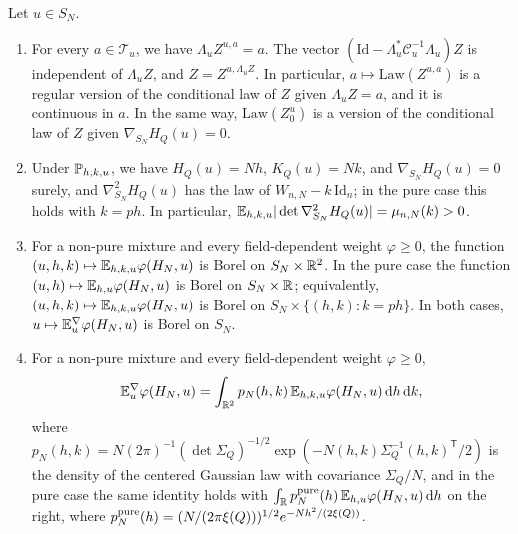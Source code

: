 \begin{lemma}\label{lem:kr-conditioned}
Let $u\in S_N$.
\begin{enumerate}
\item For every $a\in \mathcal T_u$, we have $\Lambda_uZ^{u,a}=a$. The vector $(\mathrm{Id}-\Lambda_u^{*}\mathcal C_u^{-1}\Lambda_u)Z$ is independent of $\Lambda_uZ$, and $Z=Z^{u,\Lambda_uZ}$. In particular, $a\mapsto\mathrm{Law}(Z^{u,a})$ is a regular version of the conditional law of $Z$ given $\Lambda_uZ=a$, and it is continuous in $a$. In the same way, $\mathrm{Law}(Z^u_0)$ is a version of the conditional law of $Z$ given $\nabla_{S_N}H_Q(u)=0$.
\item Under $\mathbb P_{h,k,u}$, we have $H_Q(u)=Nh$, $K_Q(u)=Nk$, and $\nabla_{S_N}H_Q(u)=0$ surely, and $\nabla^2_{S_N}H_Q(u)$ has the law of $W_{n,N}-k\,\mathrm{Id}_n$; in the pure case this holds with $k=ph$. In particular, $\mathbb E_{h,k,u}|\det\nabla^2_{S_N}H_Q(u)|=\mu_{n,N}(k)>0$.
\item For a non-pure mixture and every field-dependent weight $\varphi\ge0$, the function $(u,h,k)\mapsto\mathbb E_{h,k,u}\varphi(H_N,u)$ is Borel on $S_N\times\mathbb R^2$. In the pure case the function $(u,h)\mapsto\mathbb E_{h,u}\varphi(H_N,u)$ is Borel on $S_N\times\mathbb R$; equivalently, $(u,h,k)\mapsto\mathbb E_{h,k,u}\varphi(H_N,u)$ is Borel on $S_N\times\{(h,k):k=ph\}$. In both cases, $u\mapsto\mathbb E^\nabla_u\varphi(H_N,u)$ is Borel on $S_N$.
\item For a non-pure mixture and every field-dependent weight $\varphi\ge0$,
\begin{equation}\label{eq:kr-disintegration}
\mathbb E^{\nabla}_u\varphi(H_N,u)=\int_{\mathbb R^2}p_N(h,k)\,\mathbb E_{h,k,u}\varphi(H_N,u)\,\mathrm d h\,\mathrm d k,
\end{equation}
where $p_N(h,k)=N(2\pi)^{-1}(\det\Sigma_Q)^{-1/2}\exp(-N(h,k)\Sigma_Q^{-1}(h,k)^{\mathsf T}/2)$ is the density of the centered Gaussian law with covariance $\Sigma_Q/N$,
and in the pure case the same identity holds with $\int_\mathbb R p_N^{\rm pure}(h)\,\mathbb E_{h,u}\varphi(H_N,u)\,\mathrm d h$ on the right, where $p^{\rm pure}_N(h)=(N/(2\pi\xi(Q)))^{1/2}e^{-Nh^2/(2\xi(Q))}$.
\end{enumerate}
\end{lemma}

